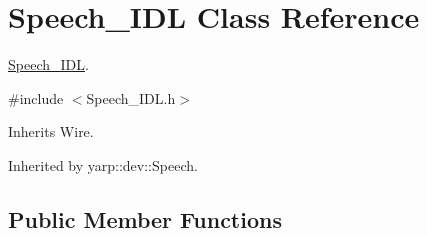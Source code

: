\section{Speech\+\_\+\+I\+DL Class Reference}
\label{classSpeech__IDL}


\hyperlink{classSpeech__IDL}{Speech\+\_\+\+I\+DL}.  




{\ttfamily \#include $<$Speech\+\_\+\+I\+D\+L.\+h$>$}



Inherits Wire.



Inherited by yarp\+::dev\+::\+Speech.

\subsection*{Public Member Functions}

